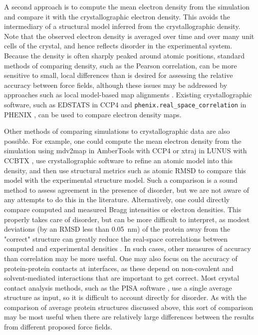 \documentclass[9pt,review]{livecoms}
\begin{document}
A second approach is to compute the mean electron density from the simulation \cite{grosse-kunstleve_computational_2002,wall_methods_2009,winn_overview_2011,case_amber_2022} and compare it with the crystallographic electron density.
This avoids the intermediary of a structural model inferred from the crystallographic density.
Note that the observed electron density is averaged over time and over many unit cells of the crystal, and hence reflects disorder in the experimental system.
Because the density is often sharply peaked around atomic positions, standard methods of comparing density, such as the Pearson correlation, can be more sensitive to small, local differences than is desired for assessing the relative accuracy between force fields, although these issues may be addressed by approaches such as local model-based map alignments \cite{pearce_multi-crystal_2017}.
Existing crystallographic software, such as EDSTATS in CCP4 \cite{winn_overview_2011} and \verb|phenix.real_space_correlation| in PHENIX \cite{liebschner_macromolecular_2019}, can be used to compare electron density maps.

Other methods of comparing simulations to crystallographic data are also possible.
For example, one could compute the mean electron density from the simulation using mdv2map in AmberTools with CCP4 \cite{winn_overview_2011,case_amber_2022} or xtraj in LUNUS with CCBTX \cite{grosse-kunstleve_computational_2002,wall_methods_2009}, use crystallographic software to refine an atomic model into this density, and then use structural metrics such as atomic RMSD to compare this model with the experimental structure model.
Such a comparison is a sound method to assess agreement in the presence of disorder, but we are not aware of any attempts to do this in the literature.
Alternatively, one could directly compare computed and measured Bragg intensities or electron densities.
This properly takes care of disorder, but can be more difficult to interpret, as modest deviations (by an RMSD less than \qty{0.05}{\nano\meter}) of the protein away from the "correct" structure can greatly reduce the real-space correlations between computed and experimental densities \cite{wall_internal_2018}.
In such cases, other measures of accuracy than correlation may be more useful.
One may also focus on the accuracy of protein-protein contacts at interfaces, as these depend on non-covalent and solvent-mediated interactions that are important to get correct.
Most crystal contact analysis methods, such as the PISA software \cite{krissinel_inference_2007}, use a single average structure as input, so it is difficult to account directly for disorder.
As with the comparison of average protein structures discussed above, this sort of comparison may be most useful when there are relatively large differences between the results from different proposed force fields.
\end{document}

